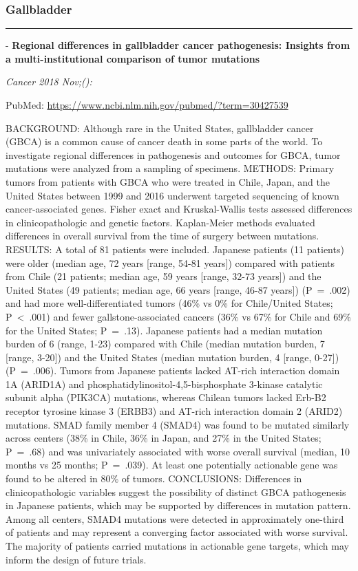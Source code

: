 \documentclass[]{article}
\begin{document}
\hypertarget{gallbladder-2}{%
\subsubsection{Gallbladder}\label{gallbladder-2}}

\begin{center}\rule{0.5\linewidth}{\linethickness}\end{center}

 - \textbf{Regional differences in gallbladder cancer pathogenesis:
Insights from a multi-institutional comparison of tumor mutations}

\emph{Cancer 2018 Nov;():}

PubMed: \url{https://www.ncbi.nlm.nih.gov/pubmed/?term=30427539}

BACKGROUND: Although rare in the United States, gallbladder cancer
(GBCA) is a common cause of cancer death in some parts of the world. To
investigate regional differences in pathogenesis and outcomes for GBCA,
tumor mutations were analyzed from a sampling of specimens. METHODS:
Primary tumors from patients with GBCA who were treated in Chile, Japan,
and the United States between 1999 and 2016 underwent targeted
sequencing of known cancer-associated genes. Fisher exact and
Kruskal-Wallis tests assessed differences in clinicopathologic and
genetic factors. Kaplan-Meier methods evaluated differences in overall
survival from the time of surgery between mutations. RESULTS: A total of
81 patients were included. Japanese patients (11 patients) were older
(median age, 72 years {[}range, 54-81 years{]}) compared with patients
from Chile (21 patients; median age, 59 years {[}range, 32-73 years{]})
and the United States (49 patients; median age, 66 years {[}range, 46-87
years{]}) (P~=~.002) and had more well-differentiated tumors (46\% vs
0\% for Chile/United States; P~\textless{}~.001) and fewer
gallstone-associated cancers (36\% vs 67\% for Chile and 69\% for the
United States; P~=~.13). Japanese patients had a median mutation burden
of 6 (range, 1-23) compared with Chile (median mutation burden, 7
{[}range, 3-20{]}) and the United States (median mutation burden, 4
{[}range, 0-27{]}) (P~=~.006). Tumors from Japanese patients lacked
AT-rich interaction domain 1A (ARID1A) and
phosphatidylinositol-4,5-bisphosphate 3-kinase catalytic subunit alpha
(PIK3CA) mutations, whereas Chilean tumors lacked Erb-B2 receptor
tyrosine kinase 3 (ERBB3) and AT-rich interaction domain 2 (ARID2)
mutations. SMAD family member 4 (SMAD4) was found to be mutated
similarly across centers (38\% in Chile, 36\% in Japan, and 27\% in the
United States; P~=~.68) and was univariately associated with worse
overall survival (median, 10 months vs 25 months; P~=~.039). At least
one potentially actionable gene was found to be altered in 80\% of
tumors. CONCLUSIONS: Differences in clinicopathologic variables suggest
the possibility of distinct GBCA pathogenesis in Japanese patients,
which may be supported by differences in mutation pattern. Among all
centers, SMAD4 mutations were detected in approximately one-third of
patients and may represent a converging factor associated with worse
survival. The majority of patients carried mutations in actionable gene
targets, which may inform the design of future trials.
\end{document}
